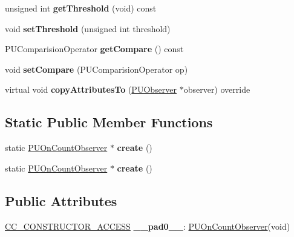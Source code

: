 \begin{DoxyCompactItemize}
unsigned int {\bfseries get\+Threshold} (void) const
\item 
\mbox{\label{classPUOnCountObserver_ac9af2e3b1283dfeae568b9a8d9330c93}} 
void {\bfseries set\+Threshold} (unsigned int threshold)
\item 
\mbox{\label{classPUOnCountObserver_aba78df5e80e3afde464c30a85b76652c}} 
P\+U\+Comparision\+Operator {\bfseries get\+Compare} () const
\item 
\mbox{\label{classPUOnCountObserver_afefcffcb573ce28b5266a88226c189e9}} 
void {\bfseries set\+Compare} (P\+U\+Comparision\+Operator op)
\item 
\mbox{\label{classPUOnCountObserver_adf4a281db05552d0abb4878cb859ac07}} 
virtual void {\bfseries copy\+Attributes\+To} (\hyperlink{classPUObserver}{P\+U\+Observer} $\ast$observer) override
\end{DoxyCompactItemize}
\subsection*{Static Public Member Functions}
\begin{DoxyCompactItemize}
\item 
\mbox{\label{classPUOnCountObserver_a0743aeff393922da3054a0755c611657}} 
static \hyperlink{classPUOnCountObserver}{P\+U\+On\+Count\+Observer} $\ast$ {\bfseries create} ()
\item 
\mbox{\label{classPUOnCountObserver_a30d632b7d80ce8ec6c99eec1c47a7365}} 
static \hyperlink{classPUOnCountObserver}{P\+U\+On\+Count\+Observer} $\ast$ {\bfseries create} ()
\end{DoxyCompactItemize}
\subsection*{Public Attributes}
\begin{DoxyCompactItemize}
\item 
\mbox{\label{classPUOnCountObserver_a16c23dd9682e8a03ee86d04e8e05db05}} 
\hyperlink{_2cocos2d_2cocos_2base_2ccConfig_8h_a25ef1314f97c35a2ed3d029b0ead6da0}{C\+C\+\_\+\+C\+O\+N\+S\+T\+R\+U\+C\+T\+O\+R\+\_\+\+A\+C\+C\+E\+SS} {\bfseries \+\_\+\+\_\+pad0\+\_\+\+\_\+}\+: \hyperlink{classPUOnCountObserver}{P\+U\+On\+Count\+Observer}(void)
\end{DoxyCompactItemize}
